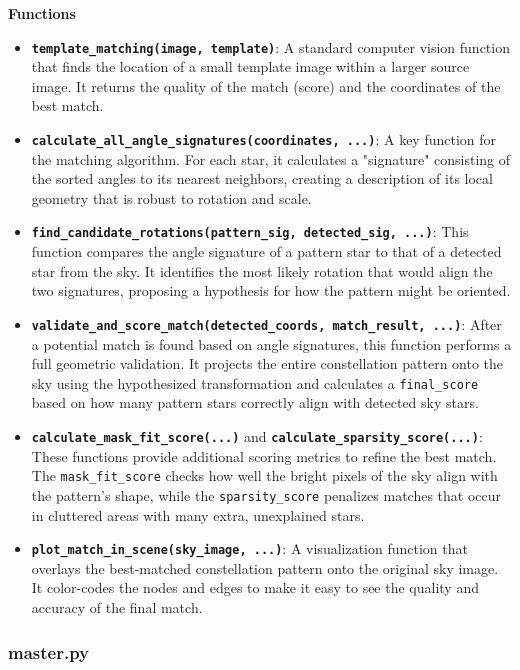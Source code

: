 \documentclass[a4paper,11pt]{article}
\begin{document}
	\textbf{Functions}
	
	\begin{itemize}
		\item \textbf{\texttt{template\_matching(image, template)}}: A standard computer vision function that finds the location of a small template image within a larger source image. It returns the quality of the match (score) and the coordinates of the best match.
		\item \textbf{\texttt{calculate\_all\_angle\_signatures(coordinates, ...)}}: A key function for the matching algorithm. For each star, it calculates a "signature" consisting of the sorted angles to its nearest neighbors, creating a description of its local geometry that is robust to rotation and scale.
		\item \textbf{\texttt{find\_candidate\_rotations(pattern\_sig, detected\_sig, ...)}}: This function compares the angle signature of a pattern star to that of a detected star from the sky. It identifies the most likely rotation that would align the two signatures, proposing a hypothesis for how the pattern might be oriented.
		\item \textbf{\texttt{validate\_and\_score\_match(detected\_coords, match\_result, ...)}}: After a potential match is found based on angle signatures, this function performs a full geometric validation. It projects the entire constellation pattern onto the sky using the hypothesized transformation and calculates a \texttt{final\_score} based on how many pattern stars correctly align with detected sky stars.
		\item \textbf{\texttt{calculate\_mask\_fit\_score(...)}} and \textbf{\texttt{calculate\_sparsity\_score(...)}}: These functions provide additional scoring metrics to refine the best match. The \texttt{mask\_fit\_score} checks how well the bright pixels of the sky align with the pattern's shape, while the \texttt{sparsity\_score} penalizes matches that occur in cluttered areas with many extra, unexplained stars.
		\item \textbf{\texttt{plot\_match\_in\_scene(sky\_image, ...)}}: A visualization function that overlays the best-matched constellation pattern onto the original sky image. It color-codes the nodes and edges to make it easy to see the quality and accuracy of the final match.
	\end{itemize}
	
	\subsubsection*{master.py}
	\hrulefill
	
\end{document}
